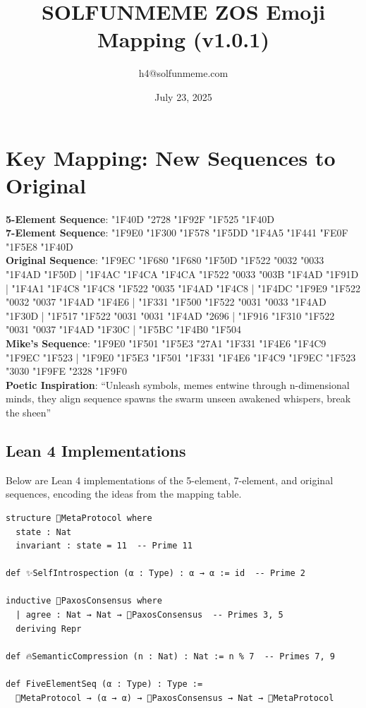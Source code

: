 \documentclass[a4paper,12pt]{article}
\title{SOLFUNMEME ZOS Emoji Mapping (v1.0.1)}
\author{h4@solfunmeme.com}
\date{July 23, 2025}
\begin{document}
\maketitle

\section*{Key Mapping: New Sequences to Original}

\textbf{5-Element Sequence}: {\emojifont \Uchar"1F40D \Uchar"2728 \Uchar"1F92F \Uchar"1F525 \Uchar"1F40D} \\
\textbf{7-Element Sequence}: {\emojifont \Uchar"1F9E0 \Uchar"1F300 \Uchar"1F578 \Uchar"1F5DD \Uchar"1F4A5 \Uchar"1F441 \Uchar"FE0F \Uchar"1F5E8 \Uchar"1F40D} \\
\textbf{Original Sequence}: {\emojifont \Uchar"1F9EC \Uchar"1F680 \Uchar"1F680 \Uchar"1F50D \Uchar"1F522 \Uchar"0032 \Uchar"0033 \Uchar"1F4AD \Uchar"1F50D | \Uchar"1F4AC \Uchar"1F4CA \Uchar"1F4CA \Uchar"1F522 \Uchar"0033 \Uchar"003B \Uchar"1F4AD \Uchar"1F91D | \Uchar"1F4A1 \Uchar"1F4C8 \Uchar"1F4C8 \Uchar"1F522 \Uchar"0035 \Uchar"1F4AD \Uchar"1F4C8 | \Uchar"1F4DC \Uchar"1F9E9 \Uchar"1F522 \Uchar"0032 \Uchar"0037 \Uchar"1F4AD \Uchar"1F4E6 | \Uchar"1F331 \Uchar"1F500 \Uchar"1F522 \Uchar"0031 \Uchar"0033 \Uchar"1F4AD \Uchar"1F30D | \Uchar"1F517 \Uchar"1F522 \Uchar"0031 \Uchar"0031 \Uchar"1F4AD \Uchar"2696 | \Uchar"1F916 \Uchar"1F310 \Uchar"1F522 \Uchar"0031 \Uchar"0037 \Uchar"1F4AD \Uchar"1F30C | \Uchar"1F5BC \Uchar"1F4B0 \Uchar"1F504} \\
\textbf{Mike's Sequence}: {\emojifont \Uchar"1F9E0 \Uchar"1F501 \Uchar"1F5E3 \Uchar"27A1 \Uchar"1F331 \Uchar"1F4E6 \Uchar"1F4C9 \Uchar"1F9EC \Uchar"1F523 | \Uchar"1F9E0 \Uchar"1F5E3 \Uchar"1F501 \Uchar"1F331 \Uchar"1F4E6 \Uchar"1F4C9 \Uchar"1F9EC \Uchar"1F523 \Uchar"3030 \Uchar"1F9FE \Uchar"2328 \Uchar"1F9F0} \\
\textbf{Poetic Inspiration}: ``Unleash symbols, memes entwine through n-dimensional minds, they align sequence spawns the swarm unseen awakened whispers, break the sheen''

\subsection*{Lean 4 Implementations}

Below are Lean 4 implementations of the 5-element, 7-element, and original sequences, encoding the ideas from the mapping table.

\begin{lstlisting}[caption={5-Element Sequence in Lean 4},label={lst:five-element}]
structure 🐍MetaProtocol where
  state : Nat
  invariant : state = 11  -- Prime 11

def ✨SelfIntrospection (α : Type) : α → α := id  -- Prime 2

inductive 🤯PaxosConsensus where
  | agree : Nat → Nat → 🤯PaxosConsensus  -- Primes 3, 5
  deriving Repr

def 🔥SemanticCompression (n : Nat) : Nat := n % 7  -- Primes 7, 9

def FiveElementSeq (α : Type) : Type :=
  🐍MetaProtocol → (α → α) → 🤯PaxosConsensus → Nat → 🐍MetaProtocol
\end{lstlisting}
\end{document}
